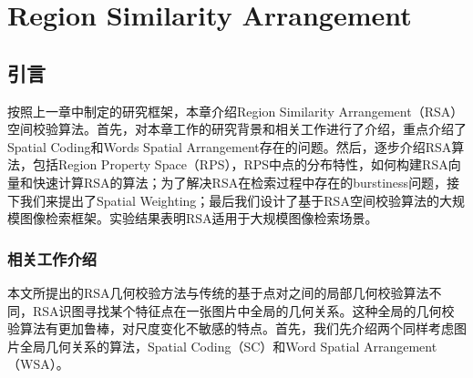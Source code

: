 
\chapter{Region Similarity Arrangement}
\section{引言}
按照上一章中制定的研究框架，本章介绍Region Similarity Arrangement（RSA）空间校验算法。首先，对本章工作的研究背景和相关工作进行了介绍，重点介绍了Spatial Coding\cite{zhou2010spatial}和Words Spatial Arrangement\cite{penatti2014visual}存在的问题。然后，逐步介绍RSA算法，包括Region Property Space（RPS），RPS中点的分布特性，如何构建RSA向量和快速计算RSA的算法；为了解决RSA在检索过程中存在的burstiness\cite{jegou2009burstiness}问题，接下我们来提出了Spatial Weighting；最后我们设计了基于RSA空间校验算法的大规模图像检索框架。实验结果表明RSA适用于大规模图像检索场景。

\subsection{相关工作介绍}
本文所提出的RSA几何校验方法与传统的基于点对之间的局部几何校验算法\cite{jegou2008hamming}\cite{philbin2007object}不同，RSA识图寻找某个特征点在一张图片中全局的几何关系。这种全局的几何校验算法有更加鲁棒，对尺度变化不敏感的特点。首先，我们先介绍两个同样考虑图片全局几何关系的算法，Spatial Coding（SC）\cite{zhou2010spatial}和Word Spatial Arrangement（WSA）\cite{penatti2014visual}。

